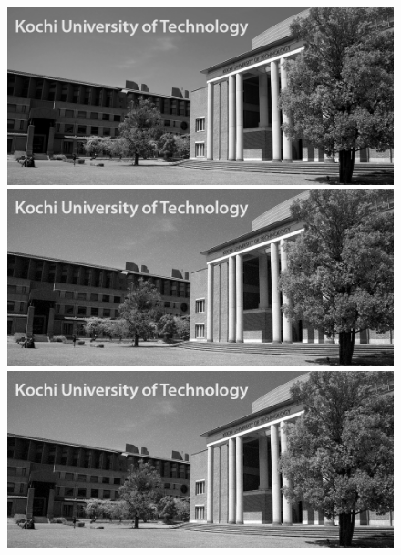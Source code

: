 \begin{figure}[H]
    \centering
    \begin{minipage}[b]{.3\textwidth}
        \centering
        \includegraphics[keepaspectratio,width=\textwidth]{../../Figures/05_21_gimg.png}
    \end{minipage}
    \begin{minipage}[b]{.3\textwidth}
        \centering
        \includegraphics[keepaspectratio,width=\textwidth]{../../06_ImageFiltering/file_white-Gaussian-Noise.png}
    \end{minipage}
    \begin{minipage}[b]{.3\textwidth}
        \centering
        \includegraphics[keepaspectratio,width=\textwidth]{../../06_ImageFiltering/file_impluse-noise.png}

\end{minipage}
\end{figure}
